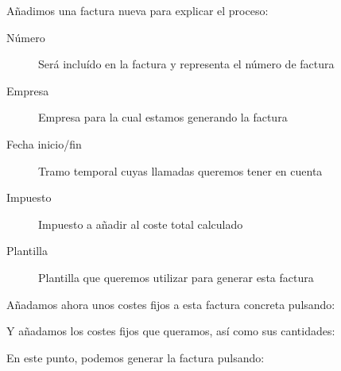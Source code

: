 \documentclass[letterpaper,10pt,spanish]{sphinxmanual}
\begin{document}
Añadimos una factura nueva para explicar el proceso:

\begin{description}
\item[{Número}] \leavevmode{}\label{billing_and_invoices/invoices:term-numero}
Será incluído en la factura y representa el número de factura

\item[{Empresa}] \leavevmode{}\label{billing_and_invoices/invoices:term-empresa}
Empresa para la cual estamos generando la factura

\item[{Fecha inicio/fin}] \leavevmode{}\label{billing_and_invoices/invoices:term-fecha-inicio-fin}
Tramo temporal cuyas llamadas queremos tener en cuenta

\item[{Impuesto}] \leavevmode{}\label{billing_and_invoices/invoices:term-impuesto}
Impuesto a añadir al coste total calculado

\item[{Plantilla}] \leavevmode{}\label{billing_and_invoices/invoices:term-plantilla}
Plantilla que queremos utilizar para generar esta factura

\end{description}

Añadamos ahora unos costes fijos a esta factura concreta pulsando:


Y añadamos los costes fijos que queramos, así como sus cantidades:


En este punto, podemos generar la factura pulsando:

\end{document}
